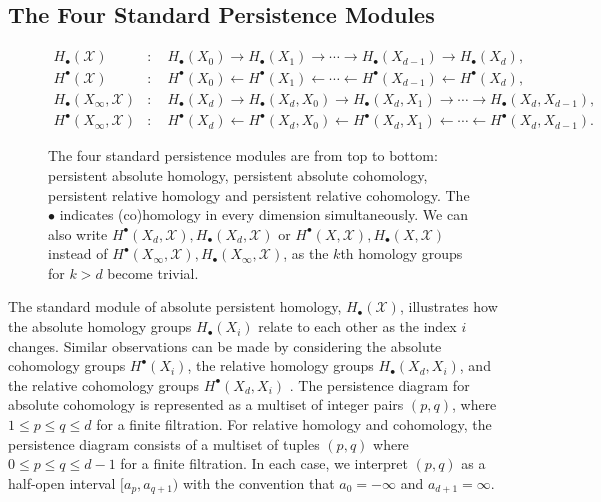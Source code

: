 \subsection{The Four Standard Persistence Modules}
\label{TheFourStandardPersistenceModules}
\begin{figure}[t!]
	\begin{align*}
		H_{\bullet}(\mathcal{X})             & : \quad H_{\bullet}(X_{0}) \rightarrow H_{\bullet}(X_{1}) \rightarrow \cdots \rightarrow H_{\bullet}(X_{d-1}) \rightarrow H_{\bullet}(X_{d}),             \\
		H^{\bullet}(\mathcal{X})             & : \quad H^{\bullet}(X_{0}) \leftarrow H^{\bullet}(X_{1}) \leftarrow \cdots \leftarrow H^{\bullet}(X_{d-1}) \leftarrow H^{\bullet}(X_{d}),                \\
		H_{\bullet}(X_{\infty}, \mathcal{X}) & : \quad H_{\bullet}(X_{d}) \rightarrow H_{\bullet}(X_{d},X_{0}) \rightarrow H_{\bullet}(X_{d},X_{1}) \rightarrow \cdots \rightarrow H_{\bullet}(X_{d},X_{d-1}), \\
		H^{\bullet}(X_{\infty}, \mathcal{X}) & : \quad H^{\bullet}(X_{d}) \leftarrow H^{\bullet}(X_{d},X_{0}) \leftarrow H^{\bullet}(X_{d},X_{1}) \leftarrow \cdots \leftarrow H^{\bullet}(X_{d}, X_{d-1}).
	\end{align*}
	\caption{The four standard persistence modules are from top to bottom: persistent absolute homology, persistent absolute cohomology, persistent relative homology and persistent relative cohomology. The $\bullet$ indicates (co)homology in every dimension simultaneously. We can also write $H^{\bullet}(X_{d}, \mathcal{X}), H_{\bullet}(X_{d}, \mathcal{X})$ or $H^{\bullet}(X, \mathcal{X}), H_{\bullet}(X, \mathcal{X})$ instead of $H^{\bullet}(X_{\infty}, \mathcal{X}), H_{\bullet}(X_{\infty}, \mathcal{X})$, as the $k$th homology groups for $k > d$ become trivial.}
\end{figure}
The standard module of absolute persistent homology, $H_{\bullet}(\mathcal{X})$, illustrates how the absolute homology groups
$H_{\bullet}(X_{i})$ relate to each other as the index $i$ changes. Similar observations
can be made by considering the absolute cohomology groups $H^{\bullet}(X_{i})$,
the relative homology groups $H_{\bullet}(X_{d}, X_{i})$, and the relative cohomology
groups $H^{\bullet}(X_{d}, X_{i})$ \cite[\S 2.4]{de2011dualities}. The persistence diagram for absolute cohomology is represented as a multiset of integer
pairs $(p,q)$, where $1 \leq p \leq q \leq d$ for a finite filtration. For relative
homology and cohomology, the persistence diagram consists of a multiset of
tuples $(p,q)$ where $0 \leq p \leq q \leq d-1$ for a finite filtration. In each
case, we interpret $(p,q)$ as a half-open interval $[a_{p}, a_{q+1})$ with the
convention that $a_{0} = -\infty$ and $a_{d+1} = \infty$.

